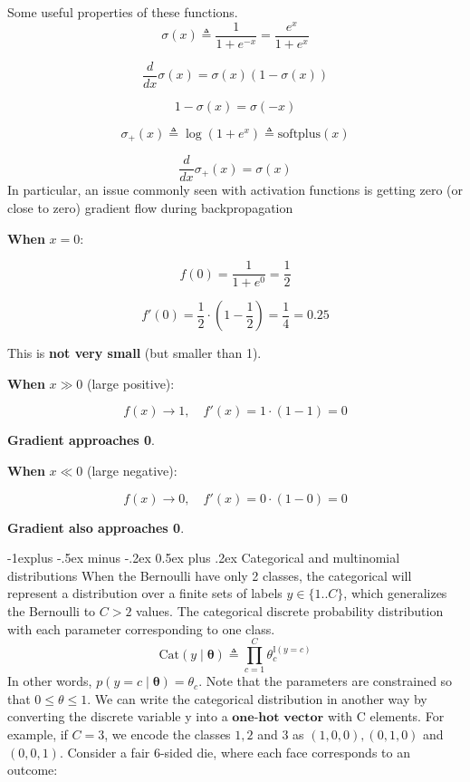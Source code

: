 \documentclass[10pt,landscape]{article}
\makeatletter
\newcommand{\parameter}{\boldsymbol{\theta}}
\renewcommand{\subsection}{\@startsection{subsection}{2}{0mm}%
                                {-1explus -.5ex minus -.2ex}%
                                {0.5ex plus .2ex}%
                                {\normalfont\normalsize\bfseries}}
\makeatother
\begin{document}
\begin{multicols*}{3}
Some useful properties of these functions.
\[
\sigma(x) \triangleq \frac{1}{1 + e^{-x}} = \frac{e^x}{1 + e^x}
\]

\[
\frac{d}{dx} \sigma(x) = \sigma(x)(1 - \sigma(x))
\]

\[
1 - \sigma(x) = \sigma(-x)
\]

\[
\sigma_+(x) \triangleq \log(1 + e^x) \triangleq \text{softplus}(x)
\]

\[
\frac{d}{dx} \sigma_+(x) = \sigma(x)
\]
In particular, an issue commonly seen with activation functions is getting zero (or close to zero) gradient flow during backpropagation

\textbf{When} \( x = 0 \):

\[
f(0) = \frac{1}{1 + e^0} = \frac{1}{2}
\]

\[
f'(0) = \frac{1}{2} \cdot \left(1 - \frac{1}{2} \right) = \frac{1}{4} = 0.25
\]

This is \textbf{not very small} (but smaller than 1).

\textbf{When} \( x \gg 0 \) (large positive):

\[
f(x) \to 1, \quad f'(x) = 1 \cdot (1 - 1) = 0
\]

\textbf{Gradient approaches 0}.

\textbf{When} \( x \ll 0 \) (large negative):

\[
f(x) \to 0, \quad f'(x) = 0 \cdot (1 - 0) = 0
\]

\textbf{Gradient also approaches 0}.

\subsection{Categorical and multinomial distributions}
When the Bernoulli have only 2 classes, the categorical will represent a distribution over a finite sets of labels $y \in \{1..C\}$, which generalizes the Bernoulli to $C > 2$ values. The categorical discrete probability distribution with each parameter corresponding to one class.
\[
\text{Cat}(y \mid \parameter) \triangleq \prod_{c=1}^{C} \theta_c^{\mathbb{I}(y=c)}
\]
In other words, $p(y=c \mid\parameter)=\theta_c$. Note that the parameters are constrained so that $0\leq\theta\leq1$. We can write the categorical distribution in another way by converting the discrete variable y into a $\textbf{one-hot vector}$ with C elements. For example, if $C=3$, we encode the classes $1,2$ and $3$ as $(1,0,0),(0,1,0)$ and $(0,0,1)$. 
Consider a fair 6-sided die, where each face corresponds to an outcome:


\end{multicols*}
\end{document}
